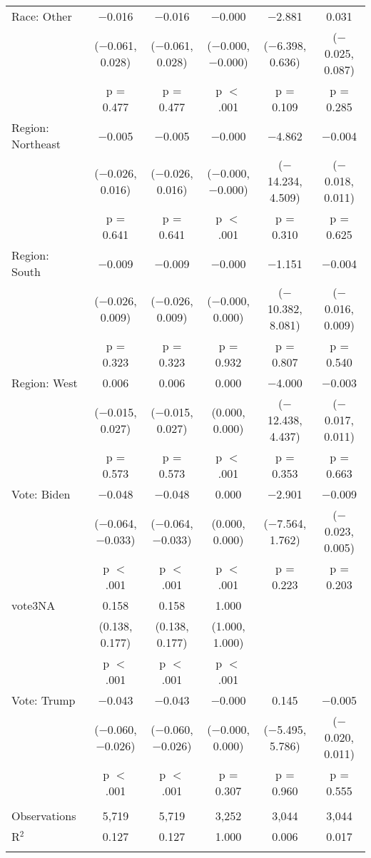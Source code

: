 \begin{tabular}{@{\extracolsep{5pt}}lccccc}
  Race: Other & $-$0.016 & $-$0.016 & $-$0.000 & $-$2.881 & 0.031 \\ 
  & ($-$0.061, 0.028) & ($-$0.061, 0.028) & ($-$0.000, $-$0.000) & ($-$6.398, 0.636) & ($-$0.025, 0.087) \\ 
  & p = 0.477 & p = 0.477 & p $<$ .001 & p = 0.109 & p = 0.285 \\ 
  Region: Northeast & $-$0.005 & $-$0.005 & $-$0.000 & $-$4.862 & $-$0.004 \\ 
  & ($-$0.026, 0.016) & ($-$0.026, 0.016) & ($-$0.000, $-$0.000) & ($-$14.234, 4.509) & ($-$0.018, 0.011) \\ 
  & p = 0.641 & p = 0.641 & p $<$ .001 & p = 0.310 & p = 0.625 \\ 
  Region: South & $-$0.009 & $-$0.009 & $-$0.000 & $-$1.151 & $-$0.004 \\ 
  & ($-$0.026, 0.009) & ($-$0.026, 0.009) & ($-$0.000, 0.000) & ($-$10.382, 8.081) & ($-$0.016, 0.009) \\ 
  & p = 0.323 & p = 0.323 & p = 0.932 & p = 0.807 & p = 0.540 \\ 
  Region: West & 0.006 & 0.006 & 0.000 & $-$4.000 & $-$0.003 \\ 
  & ($-$0.015, 0.027) & ($-$0.015, 0.027) & (0.000, 0.000) & ($-$12.438, 4.437) & ($-$0.017, 0.011) \\ 
  & p = 0.573 & p = 0.573 & p $<$ .001 & p = 0.353 & p = 0.663 \\ 
  Vote: Biden & $-$0.048 & $-$0.048 & 0.000 & $-$2.901 & $-$0.009 \\ 
  & ($-$0.064, $-$0.033) & ($-$0.064, $-$0.033) & (0.000, 0.000) & ($-$7.564, 1.762) & ($-$0.023, 0.005) \\ 
  & p $<$ .001 & p $<$ .001 & p $<$ .001 & p = 0.223 & p = 0.203 \\ 
  vote3NA & 0.158 & 0.158 & 1.000 &  &  \\ 
  & (0.138, 0.177) & (0.138, 0.177) & (1.000, 1.000) &  &  \\ 
  & p $<$ .001 & p $<$ .001 & p $<$ .001 &  &  \\ 
  Vote: Trump & $-$0.043 & $-$0.043 & $-$0.000 & 0.145 & $-$0.005 \\ 
  & ($-$0.060, $-$0.026) & ($-$0.060, $-$0.026) & ($-$0.000, 0.000) & ($-$5.495, 5.786) & ($-$0.020, 0.011) \\ 
  & p $<$ .001 & p $<$ .001 & p = 0.307 & p = 0.960 & p = 0.555 \\ 
 \hline \\[-1.8ex] 

Observations & 5,719 & 5,719 & 3,252 & 3,044 & 3,044 \\ 
R$^{2}$ & 0.127 & 0.127 & 1.000 & 0.006 & 0.017 \\ 
\hline 
\hline \\[-1.8ex] 
\end{tabular} 